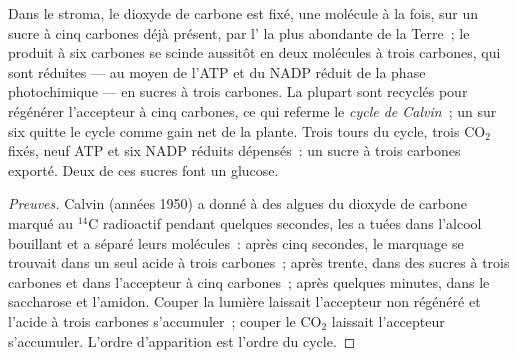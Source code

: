 \begin{proposition}\label{prop:g12:photosynthesis:calvin}
Dans le stroma, le dioxyde de carbone est fixé, une molécule à la
fois, sur un sucre à cinq carbones déjà présent, par l' la plus
abondante de la Terre~; le produit à six carbones se scinde aussitôt
en deux molécules à trois carbones, qui sont réduites --- au moyen de
l'ATP et du NADP réduit de la phase photochimique --- en sucres à
trois carbones. La plupart sont recyclés pour régénérer l'accepteur à
cinq carbones, ce qui referme le \emph{cycle de
Calvin}~; un sur six quitte le cycle comme gain
net de la plante. Trois tours du cycle, trois $\mathrm{CO_2}$ fixés,
neuf ATP et six NADP réduits dépensés~: un sucre à trois carbones
exporté. Deux de ces sucres font un glucose.
\end{proposition}
\begin{proof}[Preuves]
Calvin (années 1950) a donné à des algues du dioxyde de carbone marqué
au $^{14}$C radioactif pendant quelques secondes, les a tuées dans
l'alcool bouillant et a séparé leurs molécules~: après cinq secondes,
le marquage se trouvait dans un seul acide à trois carbones~; après
trente, dans des sucres à trois carbones et dans l'accepteur à cinq
carbones~; après quelques minutes, dans le saccharose et l'amidon.
Couper la lumière laissait l'accepteur non régénéré et l'acide à trois
carbones s'accumuler~; couper le $\mathrm{CO_2}$ laissait l'accepteur
s'accumuler. L'ordre d'apparition est l'ordre du cycle.
\end{proof}

